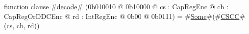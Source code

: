 function clause #\hyperref[zdecode]{decode}# (0b010010 @ 0b10000 @ cs : CapRegEnc @ cb : CapRegOrDDCEnc @ rd : IntRegEnc @ 0b00 @ 0b0111) = #\hyperref[zSome]{Some}#(#\hyperref[zCSCC]{CSCC}#(cs, cb, rd))
